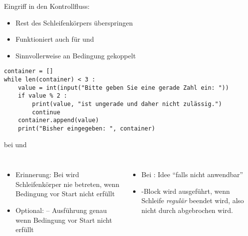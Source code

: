 
\begin{frame}[fragile]{Eingriff in den Kontrollfluss: }
%
\begin{itemize}
\item Rest des Schleifenkörpers überspringen
\item Funktioniert auch für  und 
\item Sinnvollerweise an Bedingung gekoppelt \Thus {}
\end{itemize}
%
\begin{codebox}
\begin{verbatim}
container = []
while len(container) < 3 :
    value = int(input("Bitte geben Sie eine gerade Zahl ein: "))
    if value % 2 :
        print(value, "ist ungerade und daher nicht zulässig.")
        continue
    container.append(value)
    print("Bisher eingegeben: ", container)
\end{verbatim}
\end{codebox}
%
\end{frame}


\begin{frame}[fragile]{ bei  und }
%
\begin{columns}
\begin{itemize}
\item Erinnerung: Bei  wird Schleifenkörper nie betreten, wenn Bedingung vor Start nicht erfüllt
\item Optional:  -- Ausführung genau wenn Bedingung vor Start nicht erfüllt
\end{itemize}
%
\begin{itemize}
\item Bei : Idee \enquote{falls nicht anwendbar}
\item {}-Block wird ausgeführt, wenn Schleife \emph{regulär} beendet wird, also nicht durch  abgebrochen wird.
\end{itemize}
\end{columns}
%
\end{frame}


